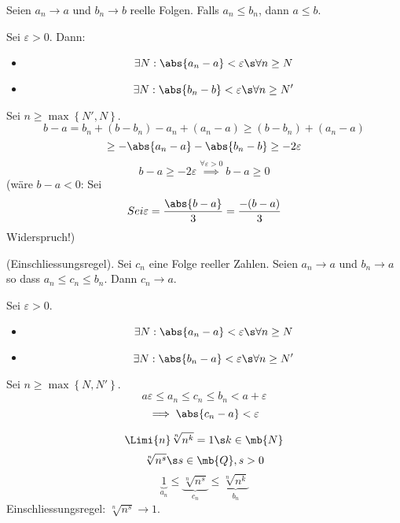 \begin{Sat}
  Seien $a_n\to a$ und $b_n\to b$ reelle Folgen. Falls $a_n\leq b_n$, dann $a\leq b$.
\end{Sat}
\begin{Bew}
  Sei $\varepsilon>0$. Dann:
  \begin{itemize}
    \item 
      \[\exists N:\abs{a_n-a}<\varepsilon\s\forall n\geq N\]
    \item
      \[\exists N:\abs{b_n-b}<\varepsilon\s\forall n\geq N'\]
  \end{itemize}
  Sei $n\geq \max\left\{ N',N \right\}$.
  \[b-a=b_n+(b-b_n)-a_n+(a_n-a)\geq (b-b_n)+(a_n-a)\]
  \[\geq -\abs{a_n-a}-\abs{b_n-b}\geq -2\varepsilon\]
  \[b-a\geq -2\varepsilon\stackrel{\forall \varepsilon>0}{\implies} b-a\geq 0\]
  (wäre $b-a<0$: Sei
  \[Sei \varepsilon=\frac{\abs{b-a}}{3}=\frac{-(b-a)}{3}\]
  Widerspruch!)
\end{Bew}
\begin{Sat}
  (Einschliessungsregel). Sei $c_n$ eine Folge reeller Zahlen. Seien $a_n\to a$ und $b_n\to a$ so dass $a_n\leq c_n\leq b_n$. Dann $c_n\to a$.
\end{Sat}
\begin{Bew}
  Sei $\varepsilon>0$.
  \begin{itemize}
    \item 
      \[\exists N:\abs{a_n-a}<\varepsilon\s\forall n\geq N\]
    \item
      \[\exists N:\abs{b_n-a}<\varepsilon\s\forall n\geq N'\]
  \end{itemize}
  Sei $n\geq \max\left\{ N,N' \right\}$.
  \[a\varepsilon\leq a_n\leq c_n\leq b_n<a+\varepsilon\]
  \[\implies \abs{c_n-a}<\varepsilon\]
\end{Bew}
\begin{Bsp}
  \[\Limi{n}\sqrt[n]{n^k}=1\s k\in\mb{N}\]
  \[\sqrt[n]{n^s}\s s\in\mb{Q}, s>0\]
  \[\underbrace{1}_{a_n}\leq\underbrace{\sqrt[n]{n^s}}_{c_n}\leq\underbrace{\sqrt[n]{n^k}}_{b_n}\]
  Einschliessungsregel: $\sqrt[n]{n^s}\to 1$.
\end{Bsp}
